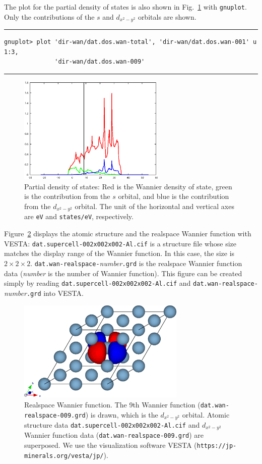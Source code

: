 \documentclass{article}
\begin{document}
The plot for the partial density of states is also shown in Fig.~\ref{pdos} with {\tt gnuplot}. Only the contributions of the $s$ and $d_{x^2-y^2}$ orbitals are shown. 
\vspace{3mm}\hrule
\begin{verbatim}
gnuplot> plot 'dir-wan/dat.dos.wan-total', 'dir-wan/dat.dos.wan-001' u 1:3, 
              'dir-wan/dat.dos.wan-009' 
\end{verbatim}
\hrule\vspace{3mm}
\begin{figure}[H] 
\centering
\includegraphics[width=7cm]{dat.pdos-Al.eps}
\caption{Partial density of states: Red is the Wannier density of state, green is the contribution from the $s$ orbital, and blue is the contribution from the $d_{x^2-y^2}$ orbital. The unit of the horizontal and vertical axes are {\tt eV} and {\tt states/eV}, respectively.}  
\label{pdos}
\end{figure}

Figure~\ref{vesta} displays the atomic structure and the realspace Wannier function with {\sc VESTA}: {\tt dat.supercell-002x002x002-Al.cif} is a structure file whose size matches the display range of the Wannier function. In this case, the size is $2\times2\times2$. {\tt dat.wan-realspace-}{\it number}{\tt .grd} is the realspace Wannier function data ({\it number} is the number of Wannier function). This figure can be created simply by reading {\tt dat.supercell-002x002x002-Al.cif} and {\tt dat.wan-realspace-}{\it number}{\tt .grd} into {\sc VESTA}.  
\begin{figure}[H] 
\centering
\includegraphics[width=8cm]{dat.wan-realspace-Al.eps}
\caption{Realspace Wannier function. The 9th Wannier function ({\tt dat.wan-realspace-009.grd}) is drawn, which is the $d_{x^2-y^2}$ orbital. Atomic structure data {\tt dat.supercell-002x002x002-Al.cif} and $d_{x^2-y^2}$ Wannier function data ({\tt dat.wan-realspace-009.grd}) are superposed. We use the visualization software {\sc VESTA} ({\tt https://jp-minerals.org/vesta/jp/}).} 
\label{vesta}
\end{figure}
\end{document}
